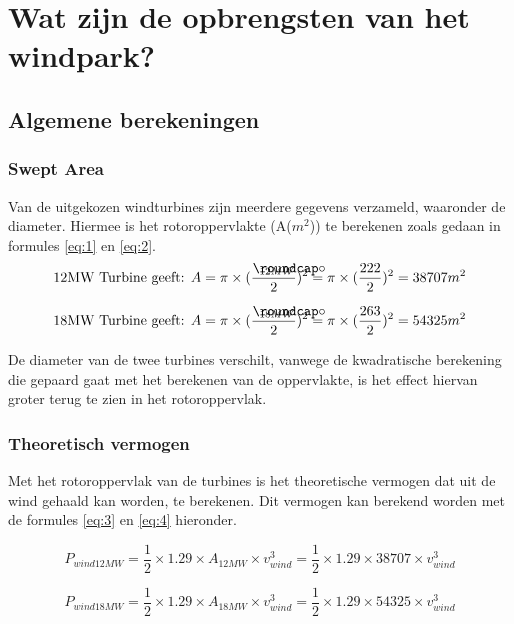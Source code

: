 \section{Wat zijn de opbrengsten van het windpark?}
\subsection{Algemene berekeningen}
\subsubsection{Swept Area}
Van de uitgekozen windturbines zijn meerdere gegevens verzameld, waaronder de diameter. Hiermee is het rotoroppervlakte (A(\(m^2\))) te berekenen zoals gedaan in formules \ref{eq:1} en \ref{eq:2}.
\begin{equation} \label{eq:1}
\text{12MW Turbine geeft: } A =\pi\times (\frac{\slashcirc_{12MW}}{2})^2 = \pi\times (\frac{222}{2})^2 = 38707 m^2
\end{equation}

\begin{equation} \label{eq:2}
\text{18MW Turbine geeft: } A =\pi\times (\frac{\slashcirc_{18MW}}{2})^2 = \pi\times (\frac{263}{2})^2 = 54325 m^2
\end{equation}

De diameter van de twee turbines verschilt, vanwege de kwadratische berekening die gepaard gaat met het berekenen van de oppervlakte, is het effect hiervan groter terug te zien in het rotoroppervlak.

\subsubsection{Theoretisch vermogen}
Met het rotoroppervlak van de turbines is het theoretische vermogen dat uit de wind gehaald kan worden, te berekenen. Dit vermogen kan berekend worden met de formules \ref{eq:3} en \ref{eq:4} hieronder. 

\begin{equation} \label{eq:3}
    P_{wind12MW} = \frac{1}{2}\times 1.29\times A_{12MW}\times v_{wind}^3 = \frac{1}{2}\times 1.29\times 38707\times v_{wind}^3
\end{equation}

\begin{equation} \label{eq:4}
    P_{wind18MW} = \frac{1}{2}\times 1.29\times A_{18MW}\times v_{wind}^3 = \frac{1}{2}\times 1.29\times 54325\times v_{wind}^3
\end{equation}

